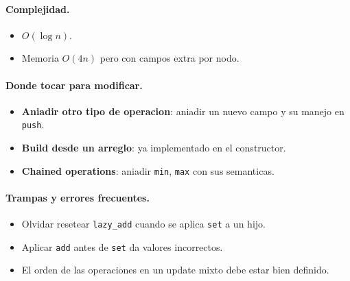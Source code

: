 \paragraph{Complejidad.}
\begin{itemize}\setlength\itemsep{0pt}
	\item $O(\log n)$.
	\item Memoria $O(4n)$ pero con campos extra por nodo.
\end{itemize}

\paragraph{Donde tocar para modificar.}
\begin{itemize}\setlength\itemsep{0pt}
	\item \textbf{Aniadir otro tipo de operacion}: aniadir un nuevo campo y su manejo en \texttt{push}.
	\item \textbf{Build desde un arreglo}: ya implementado en el constructor.
	\item \textbf{Chained operations}: aniadir \texttt{min}, \texttt{max} con sus semanticas.
\end{itemize}

\paragraph{Trampas y errores frecuentes.}
\begin{itemize}\setlength\itemsep{0pt}
	\item Olvidar resetear \texttt{lazy\_add} cuando se aplica \texttt{set} a un hijo.
	\item Aplicar \texttt{add} antes de \texttt{set} da valores incorrectos.
	\item El orden de las operaciones en un update mixto debe estar bien definido.
\end{itemize}


